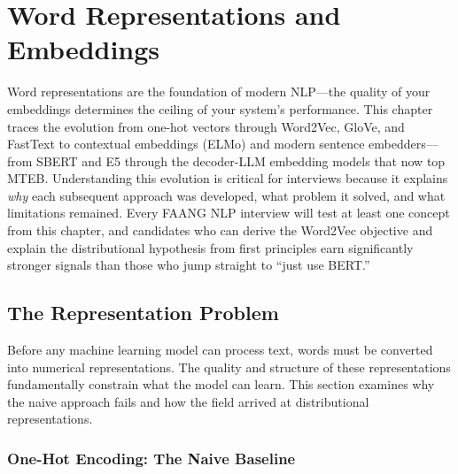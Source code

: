 
\chapter{Word Representations and Embeddings}
\label{chap:word_representations}

\begin{tldr}
Word representations are the foundation of modern NLP---the quality of your
embeddings determines the ceiling of your system's performance.  This chapter
traces the evolution from one-hot vectors through Word2Vec, GloVe, and FastText
to contextual embeddings (ELMo) and modern sentence embedders---from SBERT
and E5 through the decoder-LLM embedding models that now top MTEB.
Understanding this evolution is critical for interviews because it explains
\emph{why} each subsequent approach was developed, what problem it solved, and
what limitations remained.  Every FAANG NLP interview will test at least one
concept from this chapter, and candidates who can derive the Word2Vec objective
and explain the distributional hypothesis from first principles earn
significantly stronger signals than those who jump straight to ``just use
BERT.''
\end{tldr}

\bigskip

\section{The Representation Problem}
\label{sec:representation_problem}

Before any machine learning model can process text, words must be converted
into numerical representations.  The quality and structure of these
representations fundamentally constrain what the model can learn.  This section
examines why the naive approach fails and how the field arrived at
distributional representations.

\subsection{One-Hot Encoding: The Naive Baseline}

